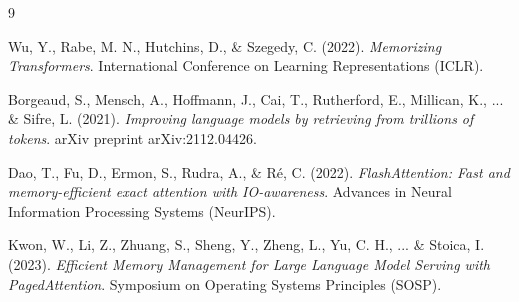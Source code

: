 \documentclass{article}
\begin{document}
\begin{thebibliography}{9}

Wu, Y., Rabe, M. N., Hutchins, D., \& Szegedy, C. (2022). 
\textit{Memorizing Transformers}. 
International Conference on Learning Representations (ICLR).

Borgeaud, S., Mensch, A., Hoffmann, J., Cai, T., Rutherford, E., Millican, K., ... \& Sifre, L. (2021). 
\textit{Improving language models by retrieving from trillions of tokens}. 
arXiv preprint arXiv:2112.04426.

Dao, T., Fu, D., Ermon, S., Rudra, A., \& Ré, C. (2022). 
\textit{FlashAttention: Fast and memory-efficient exact attention with IO-awareness}. 
Advances in Neural Information Processing Systems (NeurIPS).

Kwon, W., Li, Z., Zhuang, S., Sheng, Y., Zheng, L., Yu, C. H., ... \& Stoica, I. (2023). 
\textit{Efficient Memory Management for Large Language Model Serving with PagedAttention}. 
Symposium on Operating Systems Principles (SOSP).

\end{thebibliography}
\end{document}
